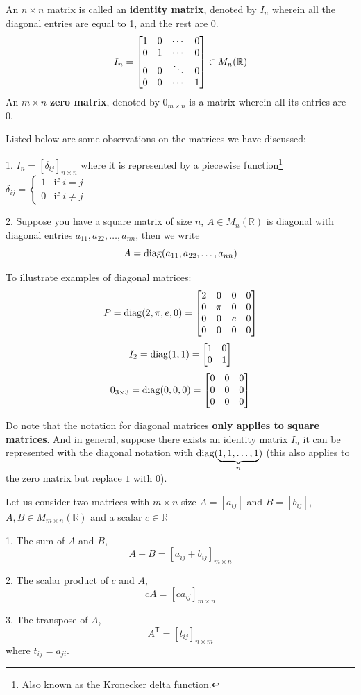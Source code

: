 \begin{definition}
An $n \times n$ matrix is called an \textbf{identity matrix}, denoted by $I_n$ wherein all the diagonal entries are equal to 1, and the rest are 0. 
$$I_n = \begin{bmatrix} 1 & 0 & \cdots & 0 \\ 0 & 1 & \cdots & 0 \\ 0 & 0 & \ddots & 0 \\ 0 & 0 & \cdots & 1 \end{bmatrix} \in M_n(\mathbb{R})$$
An $m \times n$ \textbf{zero matrix}, denoted by $0_{m \times n}$ is a matrix wherein all its entries are 0.
\end{definition}

\begin{remark} Listed below are some observations on the matrices we have discussed:

1. $I_n = [\delta_{ij}]_{n \times n}$ where it is represented by a piecewise function\footnote{Also known as the Kronecker delta function.} $\delta_{ij} = \begin{cases}
    1 & \text{if $i = j$} \\
    0 & \text{if $i \neq j$}
\end{cases}$

2. Suppose you have a square matrix of size $n$, $A \in M_n(\mathbb{R})$ is diagonal with diagonal entries $a_{11}, a_{22}, \dots, a_{nn}$, then we write
$$A = \operatorname{diag}(a_{11}, a_{22}, \dots, a_{nn})$$
\end{remark}

\lline

To illustrate examples of diagonal matrices:
$$P = \operatorname{diag}(2, \pi, e, 0) = \begin{bmatrix} 2 & 0 & 0 & 0 \\ 0 & \pi & 0 & 0 \\ 0 & 0 & e & 0 \\ 0 & 0 & 0 & 0 \end{bmatrix}$$
$$I_2 = \operatorname{diag}(1, 1) = \begin{bmatrix} 1 & 0 \\ 0 & 1 \end{bmatrix}$$
$$0_{3 \times 3} = \operatorname{diag}(0, 0, 0) = \begin{bmatrix} 0 & 0 & 0 \\ 0 & 0 & 0 \\ 0 & 0 & 0 \end{bmatrix}$$

Do note that the notation for diagonal matrices \textbf{only applies to square matrices}. And in general, suppose there exists an identity matrix $I_n$ it can be represented with the diagonal notation with $\operatorname{diag}(\underbrace{1, 1, \dots, 1}_n)$ (this also applies to the zero matrix but replace $1$ with $0$).

\begin{definition}
Let us consider two matrices with $m \times n$ size $A = [a_{ij}]$ and $B = [b_{ij}]$, $A, B \in M_{m \times n}(\mathbb{R})$ and a scalar $c \in \mathbb{R}$

1. The sum of $A$ and $B$, 
$$A + B = [a_{ij} + b_{ij}]_{m \times n}$$

2. The scalar product of $c$ and $A$, 
$$cA = [ca_{ij}]_{m \times n}$$

3. The transpose of $A$,
$$A^{\mathsf{T}} = [t_{ij}]_{n \times m}$$
where $t_{ij} = a_{ji}$.
\end{definition}

